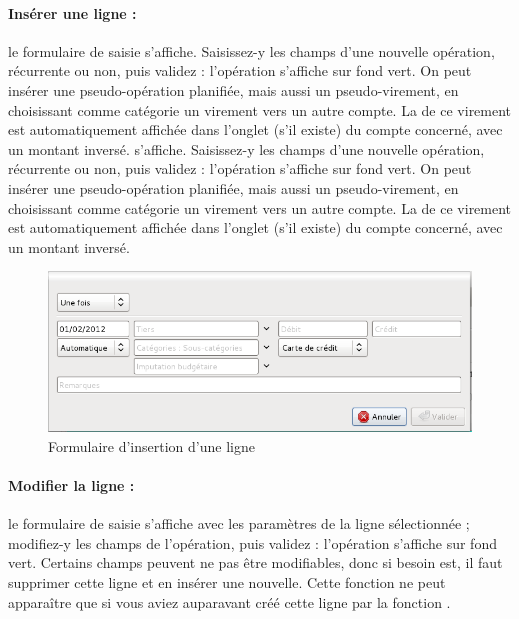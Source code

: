 \paragraph{Insérer une ligne :}le formulaire de saisie \ifIllustration s'affiche. Saisissez-y les champs d'une nouvelle opération, récurrente ou non, puis validez : l'opération s'affiche sur fond vert{\couleur}. On peut insérer une pseudo-opération planifiée, mais aussi un pseudo-virement, en choisissant comme catégorie un virement vers un autre compte. La  de ce virement est automatiquement affichée dans l'onglet  (s'il existe) du compte concerné, avec un montant inversé.
\else s'affiche. Saisissez-y les champs d'une nouvelle opération, récurrente ou non, puis validez : l'opération s'affiche sur fond vert{\couleur}. On peut insérer une pseudo-opération planifiée, mais aussi un pseudo-virement, en choisissant comme catégorie un virement vers un autre compte. La  de ce virement est automatiquement affichée dans l'onglet  (s'il existe) du compte concerné, avec un montant inversé.
\fi

\ifIllustration
\begin{figure}[htbp]
\begin{center}
\includegraphics[scale=0.5]{image/screenshot/budget_insert_line}
\end{center}
\caption{Formulaire d'insertion d'une ligne}
\label{budget-insertLine-img}
\end{figure}
\fi

\paragraph{Modifier la ligne :}le formulaire de saisie s'affiche avec les paramètres de la ligne sélectionnée ; modifiez-y les champs de l'opération, puis validez : l'opération s'affiche sur fond vert{\couleur}. Certains champs peuvent ne pas être modifiables, donc si besoin est, il faut supprimer cette ligne et en insérer une nouvelle. Cette fonction ne peut apparaître que si vous aviez auparavant créé cette ligne par la fonction .

